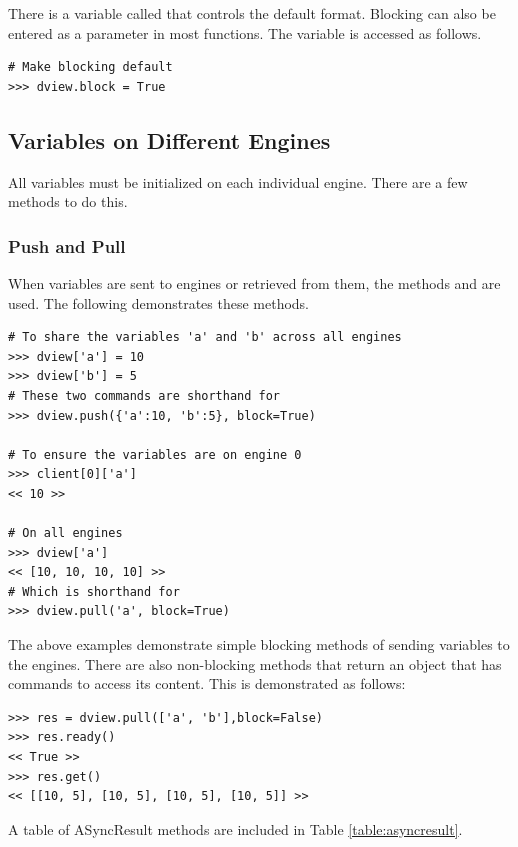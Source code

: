 There is a  variable called  that controls the default format.
Blocking can also be entered as a parameter in most functions.
The variable is accessed as follows.

\begin{lstlisting}
# Make blocking default
>>> dview.block = True
\end{lstlisting}

\subsection*{Variables on Different Engines}
All variables must be initialized on each individual engine.
There are a few methods to do this.

\subsubsection*{Push and Pull}
When variables are sent to engines or retrieved from them, the methods  and  are used.
The following demonstrates these methods.

\begin{lstlisting}
# To share the variables 'a' and 'b' across all engines
>>> dview['a'] = 10
>>> dview['b'] = 5
# These two commands are shorthand for
>>> dview.push({'a':10, 'b':5}, block=True)

# To ensure the variables are on engine 0
>>> client[0]['a']
<< 10 >>

# On all engines
>>> dview['a']
<< [10, 10, 10, 10] >>
# Which is shorthand for
>>> dview.pull('a', block=True)
\end{lstlisting}

The above examples demonstrate simple blocking methods of sending variables to the engines.
There are also non-blocking methods that return an  object that has commands to access its content.
This is demonstrated as follows:

\begin{lstlisting}
>>> res = dview.pull(['a', 'b'],block=False)
>>> res.ready()
<< True >>
>>> res.get()
<< [[10, 5], [10, 5], [10, 5], [10, 5]] >>
\end{lstlisting}

A table of ASyncResult methods are included in Table \ref{table:asyncresult}.

